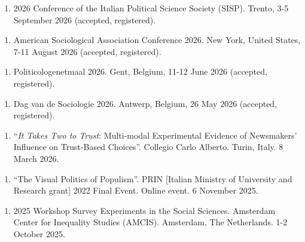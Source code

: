 \documentclass[10pt,]{article}
\providecommand{\tightlist}{%
  \setlength{\itemsep}{0pt}\setlength{\parskip}{0pt}}
\begin{document}
\begin{enumerate}
\def\labelenumi{\arabic{enumi}.}
\setcounter{enumi}{23}
\tightlist
\item
  2026 Conference of the Italian Political Science Society (SISP).
  Trento, 3-5 September 2026 (accepted, registered).
\end{enumerate}

\begin{enumerate}
\def\labelenumi{\arabic{enumi}.}
\setcounter{enumi}{22}
\tightlist
\item
  American Sociological Association Conference 2026. New York, United
  States, 7-11 August 2026 (accepted, registered).
\end{enumerate}

\begin{enumerate}
\def\labelenumi{\arabic{enumi}.}
\setcounter{enumi}{21}
\tightlist
\item
  Politicologenetmaal 2026. Gent, Belgium, 11-12 June 2026 (accepted,
  registered).
\end{enumerate}

\begin{enumerate}
\def\labelenumi{\arabic{enumi}.}
\setcounter{enumi}{20}
\tightlist
\item
  Dag van de Sociologie 2026. Antwerp, Belgium, 26 May 2026 (accepted,
  registered).
\end{enumerate}

\begin{enumerate}
\def\labelenumi{\arabic{enumi}.}
\setcounter{enumi}{19}
\tightlist
\item
  ``\emph{It Takes Two to Trust}: Multi-modal Experimental Evidence of
  Newsmakers' Influence on Trust-Based Choices''. Collegio Carlo
  Alberto. Turin, Italy. 8 March 2026.
\end{enumerate}

\begin{enumerate}
\def\labelenumi{\arabic{enumi}.}
\setcounter{enumi}{18}
\tightlist
\item
  ``The Visual Politics of Populism''. PRIN {[}Italian Ministry of
  University and Research grant{]} 2022 Final Event. Online event. 6
  November 2025.
\end{enumerate}

\begin{enumerate}
\def\labelenumi{\arabic{enumi}.}
\setcounter{enumi}{17}
\tightlist
\item
  2025 Workshop Survey Experiments in the Social Sciences. Amsterdam
  Center for Inequality Studies (AMCIS). Amsterdam, The Netherlands. 1-2
  October 2025.
\end{enumerate}
\end{document}
